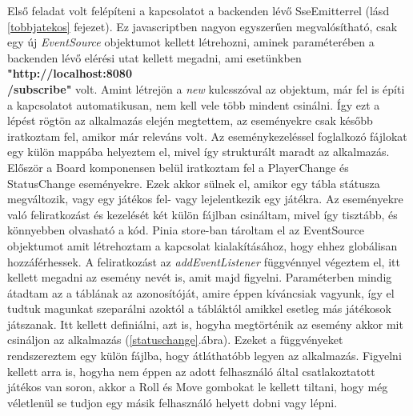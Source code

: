 \documentclass[a4paper,twoside]{article}
\begin{document}
Első feladat volt felépíteni a kapcsolatot a backenden lévő SseEmitterrel (lásd \ref{tobbjatekos} fejezet). Ez javascriptben nagyon egyszerűen megvalósítható, csak egy új \textit{EventSource} objektumot kellett létrehozni, aminek paraméterében a backenden lévő elérési utat kellett megadni, ami esetünkben \textbf{"http://localhost:8080\\/subscribe"} volt. Amint létrejön a \textit{new} kulcsszóval az objektum, már fel is építi a kapcsolatot automatikusan, nem kell vele több mindent csinálni. Így ezt a lépést rögtön az alkalmazás elején megtettem, az eseményekre csak később iratkoztam fel, amikor már releváns volt. Az eseménykezeléssel foglalkozó fájlokat egy külön mappába helyeztem el, mivel így strukturált maradt az alkalmazás.
Először a Board komponensen belül iratkoztam fel a PlayerChange és StatusChange eseményekre. Ezek akkor sülnek el, amikor egy tábla státusza megváltozik, vagy egy játékos fel- vagy lejelentkezik egy játékra. Az eseményekre való feliratkozást és kezelését két külön fájlban csináltam, mivel így tisztább, és könnyebben olvasható a kód. Pinia store-ban tároltam el az EventSource objektumot amit létrehoztam a kapcsolat kialakításához, hogy ehhez globálisan hozzáférhessek. A feliratkozást az \textit{addEventListener} függvénnyel végeztem el, itt kellett megadni az esemény nevét is, amit majd figyelni. Paraméterben mindig átadtam az a táblának az azonosítóját, amire éppen kíváncsiak vagyunk, így el tudtuk magunkat szeparálni azoktól a tábláktól amikkel esetleg más játékosok játszanak. Itt kellett definiálni, azt is, hogyha megtörténik az esemény akkor mit csináljon az alkalmazás (\ref{statuschange}.ábra). Ezeket a függvényeket rendszereztem egy külön fájlba, hogy átláthatóbb legyen az alkalmazás. Figyelni kellett arra is, hogyha nem éppen az adott felhasználó által csatlakoztatott játékos van soron, akkor a Roll és Move gombokat le kellett tiltani, hogy még véletlenül se tudjon egy másik felhasználó helyett dobni vagy lépni. 
\end{document}
